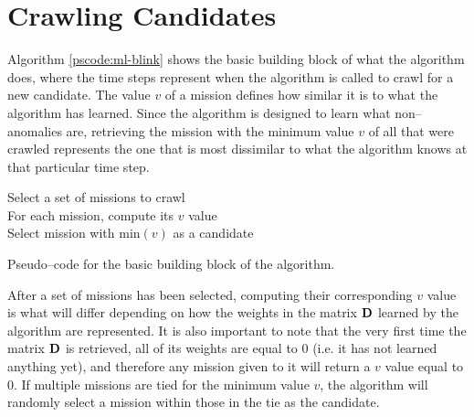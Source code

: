 \section{Crawling Candidates} \label{sect:meth:intro}

Algorithm \ref{pscode:ml-blink} shows the basic building block of what the \mlblink algorithm does, where the time steps represent when the algorithm is called to crawl for a new candidate. The value $v$ of a mission defines how similar it is to what the \mlblink algorithm has learned. Since the \mlblink algorithm is designed to learn what non--anomalies are, retrieving the mission with the minimum value $v$ of all that were crawled represents the one that is most dissimilar to what the \mlblink algorithm knows at that particular time step.

\vspace{0.4cm}
\begin{algorithm}[H]
    \SetAlgoLined
        \FMain{} {
             {
                Select a set of missions to crawl \\
                For each mission, compute its $v$ value \\
                Select mission with $\text{min}(v)$ as a candidate \\
            }
        }
    \caption{Pseudo--code for the basic building block of the \mlblink algorithm.}
    \label{pscode:ml-blink}
\end{algorithm}
\vspace{0.4cm}

After a set of missions has been selected, computing their corresponding $v$ value is what will differ depending on how the weights in the matrix $\boldsymbol{\mathbf{D}}$ learned by the algorithm are represented. It is also important to note that the very first time the matrix $\boldsymbol{\mathbf{D}}$ is retrieved, all of its weights are equal to $0$ (i.e. it has not learned anything yet), and therefore any mission given to it will return a $v$ value equal to $0$. If multiple missions are tied for the minimum value $v$, the \mlblink algorithm will randomly select a mission within those in the tie as the candidate.